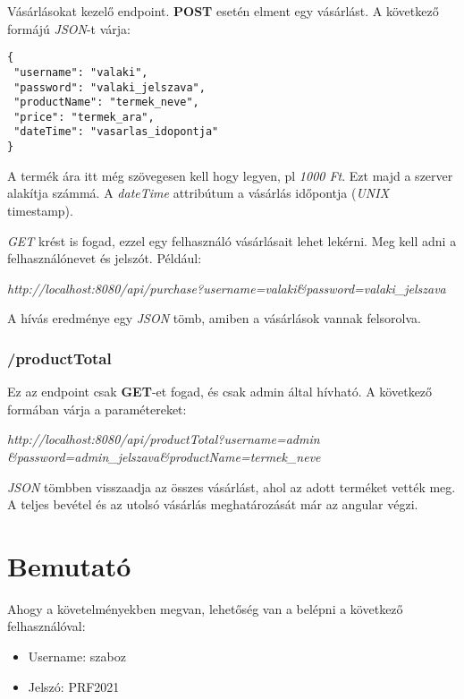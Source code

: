 \documentclass[]{article}
\begin{document}
Vásárlásokat kezelő endpoint. \textbf{POST} esetén elment egy vásárlást. A következő formájú \textit{JSON}-t várja:

\bigskip
\begin{lstlisting}
{
 "username": "valaki",
 "password": "valaki_jelszava",
 "productName": "termek_neve",
 "price": "termek_ara",
 "dateTime": "vasarlas_idopontja"
}
\end{lstlisting}

A termék ára itt még szövegesen kell hogy legyen, pl \textit{1000 Ft}. Ezt majd a szerver alakítja számmá. A \textit{dateTime} attribútum a vásárlás időpontja (\textit{UNIX} timestamp).

\textit{GET} krést is fogad, ezzel egy felhasználó vásárlásait lehet lekérni. Meg kell adni a felhasználónevet és jelszót. Például:

\begin{center}
	\textit{http://localhost:8080/api/purchase?username=valaki\&password=valaki\_jelszava}
\end{center}

A hívás eredménye egy \textit{JSON} tömb, amiben a vásárlások vannak felsorolva.

\subsubsection{/productTotal}

Ez az endpoint csak \textbf{GET}-et fogad, és csak admin által hívható. A következő formában várja a paramétereket:

\begin{center}
	\textit{http://localhost:8080/api/productTotal?username=admin
		\newline
		\&password=admin\_jelszava\&productName=termek\_neve}
\end{center}

\textit{JSON} tömbben visszaadja az összes vásárlást, ahol az adott terméket vették meg. A teljes bevétel és az utolsó vásárlás meghatározását már az angular végzi.

\section{Bemutató}

Ahogy a követelményekben megvan, lehetőség van a belépni a következő felhasználóval:

\begin{itemize}
	\item Username: szaboz
	\item Jelszó: PRF2021
\end{itemize}
\end{document}
